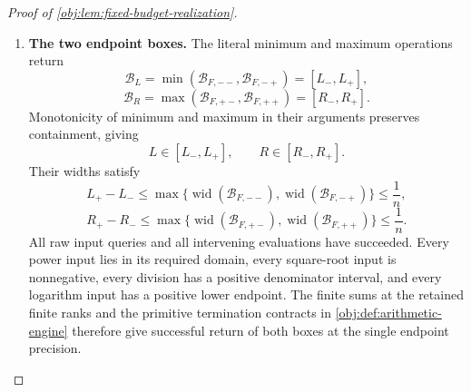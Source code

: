\begin{proof}[Proof of \cref{obj:lem:fixed-budget-realization}]
\begin{enumerate}
Define the inversion-corner boxes by
\[
\mathcal B_{F,\sigma_c\sigma_s}
=\mathcal B[F(c_{\sigma_c},s_{\sigma_s})].
\]
The logarithm derivative is at most two on every argument interval with lower endpoint at least \(1/2\). Its primitive contract therefore supplies successful boxes containing the four exact corner values, with
\[
\begin{aligned}
\operatorname{wid}(\mathcal B_{F,\sigma_c\sigma_s})
\le{}&
2\left(
512\operatorname{wid}(\mathcal B[c_{\sigma_c}])
+100(K+1)512^2
 \operatorname{wid}(\mathcal B[s_{\sigma_s}])
\right)
+6\epsilon_{\mathrm e}\\
\le{}&
\bigl(307200K^2
+15728640000(K+1)K^2+6\bigr)\epsilon_{\mathrm e}\\
\le{}&2^{37}(K+1)^3\epsilon_{\mathrm e}
\le\frac1n.
\end{aligned}
\]
For the coefficient comparison, \(K\ge0\) implies
\[
K^2\le(K+1)^3,\qquad
(K+1)K^2\le(K+1)^3,\qquad
1\le(K+1)^3,
\]
and
\[
307200+15728640000+6\le2^{37}.
\]
This establishes the required precision for each of the four corner evaluations.

\item \textbf{The two endpoint boxes.}
The literal minimum and maximum operations return
\[
\mathcal B_L
=\min(\mathcal B_{F,--},\mathcal B_{F,-+})
=[L_-,L_+],
\]
\[
\mathcal B_R
=\max(\mathcal B_{F,+-},\mathcal B_{F,++})
=[R_-,R_+].
\]
Monotonicity of minimum and maximum in their arguments preserves containment, giving
\[
L\in[L_-,L_+],
\qquad
R\in[R_-,R_+].
\]
Their widths satisfy
\[
L_+-L_-
\le\max\{
\operatorname{wid}(\mathcal B_{F,--}),
\operatorname{wid}(\mathcal B_{F,-+})\}
\le\frac1n,
\]
\[
R_+-R_-
\le\max\{
\operatorname{wid}(\mathcal B_{F,+-}),
\operatorname{wid}(\mathcal B_{F,++})\}
\le\frac1n.
\]
All raw input queries and all intervening evaluations have succeeded. Every power input lies in its required domain, every square-root input is nonnegative, every division has a positive denominator interval, and every logarithm input has a positive lower endpoint. The finite sums at the retained finite ranks and the primitive termination contracts in \cref{obj:def:arithmetic-engine} therefore give successful return of both boxes at the single endpoint precision.


\end{enumerate}
\end{proof}
